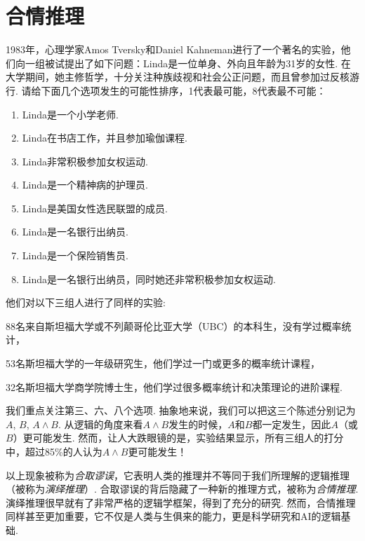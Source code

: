 \chapter{合情推理}\label{chap:plausible-reasoning}

1983年，心理学家Amos Tversky和Daniel Kahneman进行了一个著名的实验，他们向一组被试提出了如下问题：Linda是一位单身、外向且年龄为31岁的女性. 在大学期间，她主修哲学，十分关注种族歧视和社会公正问题，而且曾参加过反核游行. 请给下面几个选项发生的可能性排序，1代表最可能，8代表最不可能：
\begin{enumerate}
    \item Linda是一个小学老师.
    \item Linda在书店工作，并且参加瑜伽课程.
    \item Linda非常积极参加女权运动.
    \item Linda是一个精神病的护理员.
    \item Linda是美国女性选民联盟的成员.
    \item Linda是一名银行出纳员.
    \item Linda是一个保险销售员.
    \item Linda是一名银行出纳员，同时她还非常积极参加女权运动.
\end{enumerate}

他们对以下三组人进行了同样的实验:
\begin{enumerate*}[label=(\arabic*)]
    \item 88名来自斯坦福大学或不列颠哥伦比亚大学（UBC）的本科生，没有学过概率统计，
    \item 53名斯坦福大学的一年级研究生，他们学过一门或更多的概率统计课程，
    \item 32名斯坦福大学商学院博士生，他们学过很多概率统计和决策理论的进阶课程.
\end{enumerate*}

我们重点关注第三、六、八个选项. 抽象地来说，我们可以把这三个陈述分别记为$A$, $B$, $A\wedge B$. 从逻辑的角度来看$A\wedge B$发生的时候，$A$和$B$都一定发生，因此$A$（或$B$）更可能发生. 然而，让人大跌眼镜的是，实验结果显示，所有三组人的打分中，超过85\%的人认为$A\wedge B$更可能发生！

以上现象被称为\emph{合取谬误}，它表明人类的推理并不等同于我们所理解的逻辑推理（被称为\emph{演绎推理}）. 合取谬误的背后隐藏了一种新的推理方式，被称为\emph{合情推理}. 演绎推理很早就有了非常严格的逻辑学框架，得到了充分的研究. 然而，合情推理同样甚至更加重要，它不仅是人类与生俱来的能力，更是科学研究和AI的逻辑基础. 

